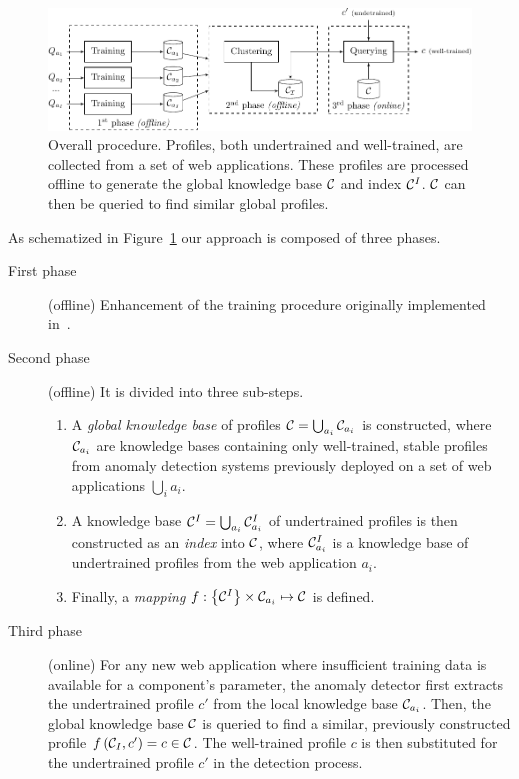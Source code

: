 \begin{figure}
  \centering
  \includegraphics[width=\textwidth]{figures/web/longtail/overview}

  \caption{Overall procedure. Profiles, both undertrained and well-trained, are collected from a set of web applications. These profiles are processed offline to generate the global knowledge base $\mathcal{C}$ and index $\mathcal{C}^I$. $\mathcal{C}$ can then be queried to find similar global profiles.}
  \label{fig:overview}
  
  \vspace*{-.4cm}
\end{figure}

As schematized in Figure~\ref{fig:overview} our approach is composed of three phases.

\begin{description}
\item [First phase] (offline) Enhancement of the training procedure originally implemented in~\citep{kruegel:jcn2005:webanomaly}.

\item[Second phase] (offline) It is divided into three sub-steps.

  \begin{enumerate}
  \item A \emph{global knowledge base} of profiles $\mathcal{C}=\bigcup_{a_i}\mathcal{C}_{a_i}$ is constructed, where $\mathcal{C}_{a_i}$ are knowledge bases containing only well-trained, stable profiles from anomaly detection systems previously deployed on a set of web applications $\bigcup_{i}a_i$.
  \item A knowledge base $\mathcal{C}^I=\bigcup_{a_i}\mathcal{C}_{a_i}^I$ of undertrained profiles is then constructed as an \emph{index} into $\mathcal{C}$, where $\mathcal{C}_{a_i}^I$ is a knowledge base of undertrained profiles from the web application $a_i$.
  \item Finally, a \emph{mapping} $f:\left\{\mathcal{C}^I\right\}\times\mathcal{C}_{a_i}\mapsto\mathcal{C}$ is defined.
  \end{enumerate}

\item[Third phase] (online) For any new web application where insufficient training data is available for a component's parameter, the anomaly detector first extracts the undertrained profile $c'$ from the local knowledge base $\mathcal{C}_{a_i}$.  Then, the global knowledge base $\mathcal{C}$ is queried to find a similar, previously constructed profile $f\left(\mathcal{C}_I,c'\right)=c\in\mathcal{C}$.  The well-trained profile $c$ is then substituted for the undertrained profile $c'$ in the detection process.
\end{description}

